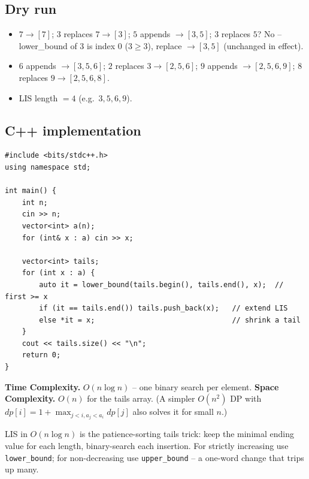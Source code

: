 \subsection*{Dry run}


\begin{itemize}
  \item $7\to[7]$; $3$ replaces $7\to[3]$; $5$ appends $\to[3,5]$; $3$
        replaces $5$? No -- lower\_bound of $3$ is index $0$ ($3\ge3$),
        replace $\to[3,5]$ (unchanged in effect).
  \item $6$ appends $\to[3,5,6]$; $2$ replaces $3\to[2,5,6]$; $9$
        appends $\to[2,5,6,9]$; $8$ replaces $9\to[2,5,6,8]$.
  \item LIS length $=4$ (e.g.\ $3,5,6,9$).
\end{itemize}

\subsection*{C++ implementation}

\begin{lstlisting}
#include <bits/stdc++.h>
using namespace std;

int main() {
    int n;
    cin >> n;
    vector<int> a(n);
    for (int& x : a) cin >> x;

    vector<int> tails;
    for (int x : a) {
        auto it = lower_bound(tails.begin(), tails.end(), x);  // first >= x
        if (it == tails.end()) tails.push_back(x);   // extend LIS
        else *it = x;                                // shrink a tail
    }
    cout << tails.size() << "\n";
    return 0;
}
\end{lstlisting}

\begin{complexitybox}
\textbf{Time Complexity.} $O(n\log n)$ -- one binary search per element.
\textbf{Space Complexity.} $O(n)$ for the tails array. (A simpler
$O(n^2)$ DP with $\textit{dp}[i]=1+\max_{j<i,a_j<a_i}\textit{dp}[j]$ also
solves it for small $n$.)
\end{complexitybox}

\begin{takeawaybox}
LIS in $O(n\log n)$ is the patience-sorting tails trick: keep the minimal
ending value for each length, binary-search each insertion. For strictly
increasing use \texttt{lower\_bound}; for non-decreasing use
\texttt{upper\_bound} -- a one-word change that trips up many.
\end{takeawaybox}
